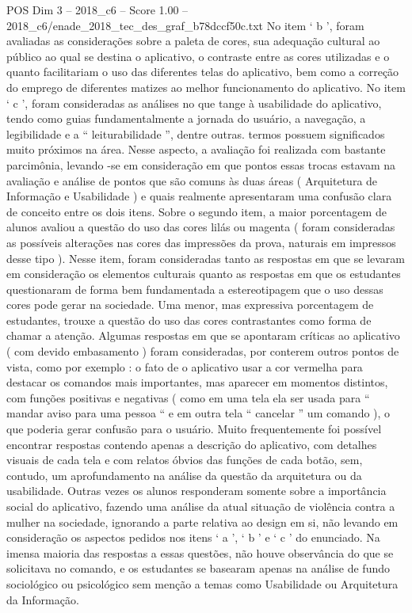 \begin{textsample}{POS Dim 3 – 2018\_c6 – Score 1.00 – 2018\_c6/enade\_2018\_tec\_des\_graf\_b78dccf50c.txt}
No item ‘ b ’, foram avaliadas as considerações sobre a paleta de cores, sua adequação cultural ao público ao qual se destina o aplicativo, o contraste entre as cores utilizadas e o quanto facilitariam o uso das diferentes telas do aplicativo, bem como a correção do emprego de diferentes matizes ao melhor funcionamento do aplicativo.
No item ‘ c ’, foram consideradas as análises no que tange à usabilidade do aplicativo, tendo como guias fundamentalmente a jornada do usuário, a navegação, a legibilidade e a “ leiturabilidade ”, dentre outras. termos possuem significados muito próximos na área.
Nesse aspecto, a avaliação foi realizada com bastante parcimônia, levando -se em consideração em que pontos essas trocas estavam na avaliação e análise de pontos que são comuns às duas áreas ( Arquitetura de Informação e Usabilidade ) e quais realmente apresentaram uma confusão clara de conceito entre os dois itens.
Sobre o segundo item, a maior porcentagem de alunos avaliou a questão do uso das cores lilás ou magenta ( foram consideradas as possíveis alterações nas cores das impressões da prova, naturais em impressos desse tipo ).
Nesse item, foram consideradas tanto as respostas em que se levaram em consideração os elementos culturais quanto as respostas em que os estudantes questionaram de forma bem fundamentada a estereotipagem que o uso dessas cores pode gerar na sociedade.
Uma menor, mas expressiva porcentagem de estudantes, trouxe a questão do uso das cores contrastantes como forma de chamar a atenção.
Algumas respostas em que se apontaram críticas ao aplicativo ( com devido embasamento ) foram consideradas, por conterem outros pontos de vista, como por exemplo : o fato de o aplicativo usar a cor vermelha para destacar os comandos mais importantes, mas aparecer em momentos distintos, com funções positivas e negativas ( como em uma tela ela ser usada para “ mandar aviso para uma pessoa “ e em outra tela “ cancelar ” um comando ), o que poderia gerar confusão para o usuário.
Muito frequentemente foi possível encontrar respostas contendo apenas a descrição do aplicativo, com detalhes visuais de cada tela e com relatos óbvios das funções de cada botão, sem, contudo, um aprofundamento na análise da questão da arquitetura ou da usabilidade.
Outras vezes os alunos responderam somente sobre a importância social do aplicativo, fazendo uma análise da atual situação de violência contra a mulher na sociedade, ignorando a parte relativa ao design em si, não levando em consideração os aspectos pedidos nos itens ‘ a ’, ‘ b ’ e ‘ c ’ do enunciado.
Na imensa maioria das respostas a essas questões, não houve observância do que se solicitava no comando, e os estudantes se basearam apenas na análise de fundo sociológico ou psicológico sem menção a temas como Usabilidade ou Arquitetura da Informação.

\end{textsample}
